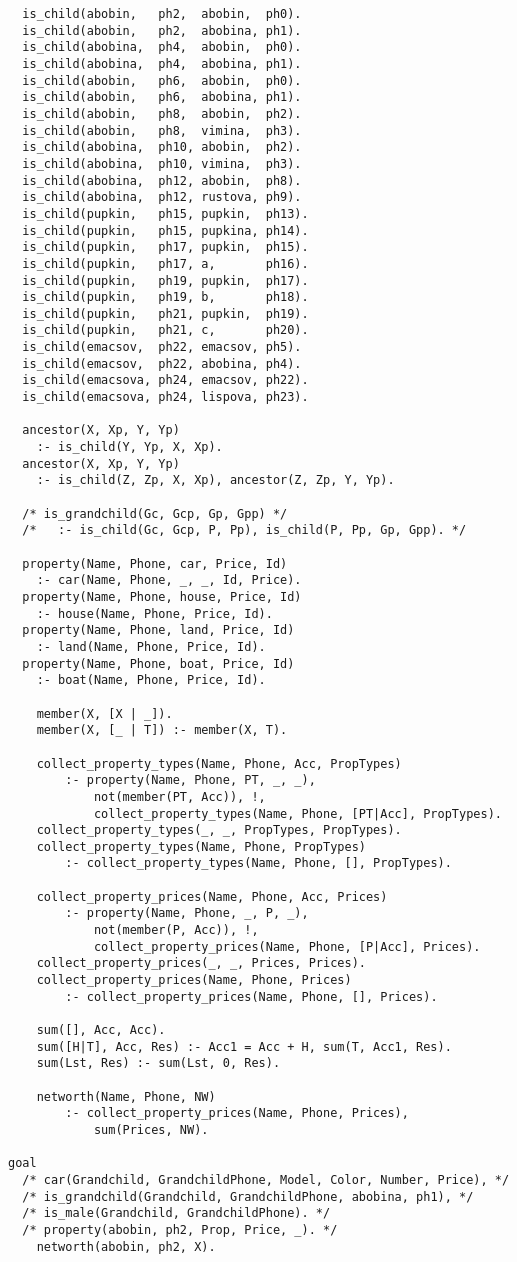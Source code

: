 \documentclass[a4paper,oneside,14pt]{extarticle}
\begin{document}
\begin{lstlisting}
  is_child(abobin,   ph2,  abobin,  ph0).
  is_child(abobin,   ph2,  abobina, ph1).
  is_child(abobina,  ph4,  abobin,  ph0).
  is_child(abobina,  ph4,  abobina, ph1).
  is_child(abobin,   ph6,  abobin,  ph0).
  is_child(abobin,   ph6,  abobina, ph1).
  is_child(abobin,   ph8,  abobin,  ph2).
  is_child(abobin,   ph8,  vimina,  ph3).
  is_child(abobina,  ph10, abobin,  ph2).
  is_child(abobina,  ph10, vimina,  ph3).
  is_child(abobina,  ph12, abobin,  ph8).
  is_child(abobina,  ph12, rustova, ph9).
  is_child(pupkin,   ph15, pupkin,  ph13).
  is_child(pupkin,   ph15, pupkina, ph14).
  is_child(pupkin,   ph17, pupkin,  ph15).
  is_child(pupkin,   ph17, a,       ph16).
  is_child(pupkin,   ph19, pupkin,  ph17).
  is_child(pupkin,   ph19, b,       ph18).
  is_child(pupkin,   ph21, pupkin,  ph19).
  is_child(pupkin,   ph21, c,       ph20).
  is_child(emacsov,  ph22, emacsov, ph5).
  is_child(emacsov,  ph22, abobina, ph4).
  is_child(emacsova, ph24, emacsov, ph22).
  is_child(emacsova, ph24, lispova, ph23).

  ancestor(X, Xp, Y, Yp)
    :- is_child(Y, Yp, X, Xp).
  ancestor(X, Xp, Y, Yp)
    :- is_child(Z, Zp, X, Xp), ancestor(Z, Zp, Y, Yp).

  /* is_grandchild(Gc, Gcp, Gp, Gpp) */
  /*   :- is_child(Gc, Gcp, P, Pp), is_child(P, Pp, Gp, Gpp). */

  property(Name, Phone, car, Price, Id)
    :- car(Name, Phone, _, _, Id, Price).
  property(Name, Phone, house, Price, Id)
    :- house(Name, Phone, Price, Id).
  property(Name, Phone, land, Price, Id)
    :- land(Name, Phone, Price, Id).
  property(Name, Phone, boat, Price, Id)
    :- boat(Name, Phone, Price, Id).

	member(X, [X | _]).
	member(X, [_ | T]) :- member(X, T).

	collect_property_types(Name, Phone, Acc, PropTypes)
		:- property(Name, Phone, PT, _, _),
			not(member(PT, Acc)), !,
			collect_property_types(Name, Phone, [PT|Acc], PropTypes).
	collect_property_types(_, _, PropTypes, PropTypes).
	collect_property_types(Name, Phone, PropTypes)
		:- collect_property_types(Name, Phone, [], PropTypes).

	collect_property_prices(Name, Phone, Acc, Prices)
		:- property(Name, Phone, _, P, _),
			not(member(P, Acc)), !,
			collect_property_prices(Name, Phone, [P|Acc], Prices).
	collect_property_prices(_, _, Prices, Prices).
	collect_property_prices(Name, Phone, Prices)
		:- collect_property_prices(Name, Phone, [], Prices).

	sum([], Acc, Acc).
	sum([H|T], Acc, Res) :- Acc1 = Acc + H, sum(T, Acc1, Res).
	sum(Lst, Res) :- sum(Lst, 0, Res).

	networth(Name, Phone, NW)
		:- collect_property_prices(Name, Phone, Prices),
			sum(Prices, NW).

goal
  /* car(Grandchild, GrandchildPhone, Model, Color, Number, Price), */
  /* is_grandchild(Grandchild, GrandchildPhone, abobina, ph1), */
  /* is_male(Grandchild, GrandchildPhone). */
  /* property(abobin, ph2, Prop, Price, _). */
	networth(abobin, ph2, X).
\end{lstlisting}

\end{document}
